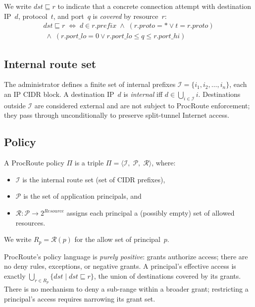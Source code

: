 \documentclass[sigconf]{acmart}
\begin{document}
We write $\mathit{dst} \sqsubseteq r$ to indicate that a concrete
connection attempt with destination IP~$d$, protocol~$t$, and
port~$q$ is \emph{covered} by resource~$r$:
\begin{multline*}
  \mathit{dst} \sqsubseteq r \;\iff\;
    d \in r.\mathit{prefix}
    \;\land\;
    (r.\mathit{proto} = \mathord{*} \lor t = r.\mathit{proto})\\
    \;\land\;
    (r.\mathit{port\_lo} = 0
      \lor r.\mathit{port\_lo} \le q \le r.\mathit{port\_hi})
\end{multline*}

\subsection{Internal route set}

The administrator defines a finite set of internal prefixes
$\mathcal{I} = \{i_1, i_2, \ldots, i_n\}$, each an IP CIDR block.
A destination IP~$d$ is \emph{internal} iff
$d \in \bigcup_{i \in \mathcal{I}} i$.
Destinations outside $\mathcal{I}$ are considered external and are
not subject to ProcRoute enforcement; they pass through
unconditionally to preserve split-tunnel Internet access.

\subsection{Policy}
\label{sec:policy}

A ProcRoute policy $\Pi$ is a triple
$\Pi = \langle \mathcal{I},\; \mathcal{P},\; \mathcal{R} \rangle$,
where:
\begin{itemize}
  \item $\mathcal{I}$ is the internal route set (set of CIDR prefixes),
  \item $\mathcal{P}$ is the set of application principals, and
  \item $\mathcal{R}: \mathcal{P} \to 2^{\mathit{Resource}}$ assigns
    each principal a (possibly empty) set of allowed resources.
\end{itemize}

We write $R_p = \mathcal{R}(p)$ for the allow set of principal~$p$.

ProcRoute's policy language is \emph{purely positive}: grants
authorize access; there are no deny rules, exceptions, or negative
grants.  A principal's effective access is exactly
$\bigcup_{r \in R_p} \{ \mathit{dst} \mid \mathit{dst} \sqsubseteq r \}$, the
union of destinations covered by its grants.  There is no mechanism
to deny a sub-range within a broader grant; restricting a
principal's access requires narrowing its grant set.
\end{document}
